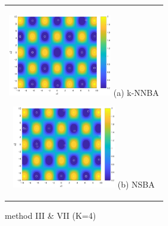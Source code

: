 \documentclass{ies2018}
\begin{document}
\begin{figure}[p]
  \begin{center}
\begin{tabular}{c}
\begin{minipage}{0.5\hsize}
  \begin{center}
   \includegraphics[width=45mm]{eps/iii_k=4_1000.eps}
   \hspace{1.0cm} (a) k-NNBA
  \end{center}
  \label{fig:k=4_iii}
 \end{minipage}

 \begin{minipage}{0.5\hsize}
  \begin{center}
   \includegraphics[width=45mm]{eps/vii_k=4_1000.eps}
   \hspace{1.0cm} (b) NSBA
  \end{center}
  \label{fig:k=4_vii}
 \end{minipage}

\end{tabular}
\caption{method III \& VII (K=4)}
\label{fig:1000_37}
\end{center}
\end{figure}
\end{document}
